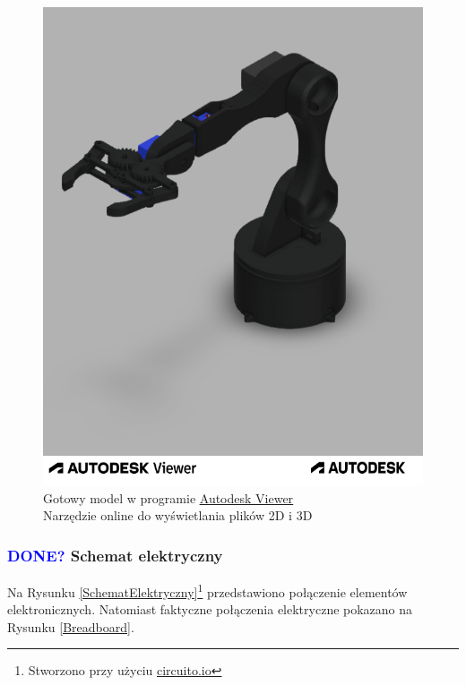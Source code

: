 \documentclass[11pt,titlepage,a4paper]{article}
\begin{document}
\newpage

\begin{figure}[h!]
    \vspace{1cm}
    \begin{center}
        \includegraphics[width=\textwidth]{img/Robak v25.f3d.png}
    \end{center}
    \vspace{1cm}
    \caption{
        Gotowy model w programie
        \href{https://viewer.autodesk.com/}
        {\underline{Autodesk Viewer}} \\ Narzędzie online do wyświetlania plików 2D i 3D}
    \label{AutodeskViewer}
\end{figure}

\newpage

\subsubsection{\textcolor{blue}{DONE?} Schemat elektryczny}

Na Rysunku \ref{SchematElektryczny}\footnote{Stworzono przy użyciu \href{https://www.circuito.io}{\underline{circuito.io}}} przedstawiono połączenie elementów elektronicznych. Natomiast faktyczne połączenia elektryczne pokazano na Rysunku \ref{Breadboard}.
\end{document}
